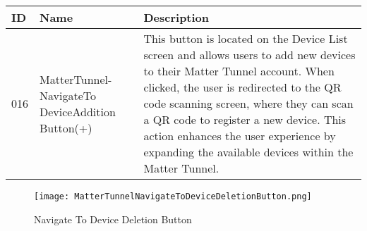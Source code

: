 \documentclass[conference]{IEEEtran}
\begin{document}
\begin{enumerate}[itemsep=2ex, parsep=1ex]
\begin{enumerate}[itemsep=2ex, parsep=1ex]
	      	      \begin{table}[h!]
	      	      	\def\arraystretch{1.24} \small
	      	      	\begin{tabular}{|p{1.2cm}|p{2.5cm}|p{4.0cm}|}
	      	      		\hline
	      	      		ID  & Name                                             & Description                                                                                                                                                                                                                                                                                                                                             \\
	      	      		\hline
	      	      		016 & MatterTunnel-NavigateTo DeviceAddition Button(+) & This button is located on the Device List screen and allows users to add new devices to their Matter Tunnel account. When clicked, the user is redirected to the QR code scanning screen, where they can scan a QR code to register a new device. This action enhances the user experience by expanding the available devices within the Matter Tunnel. \\
	      	      		\hline
	      	      	\end{tabular}
	      	      \end{table}
	      	      
	      	      \begin{figure}[h!]
	      	      	\centering
	      	      	\texttt{[image: MatterTunnelNavigateToDeviceDeletionButton.png]}
	      	      	\caption{Navigate To Device Deletion Button}
	      	      	\label{fig:MatterTunnelNavigateToDeviceDeletionButton}
	      	      \end{figure}
	      	      	      	      

\end{enumerate}
\end{enumerate}
\end{document}
